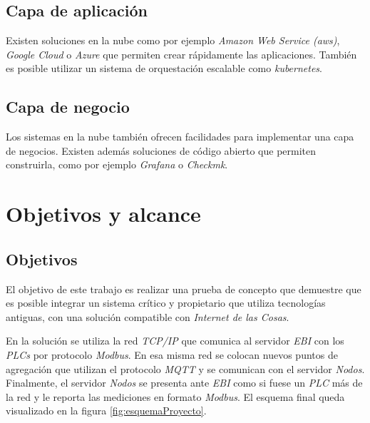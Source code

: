 	\subsection{Capa de aplicación}
	\label{artAplicacion}
	
		Existen soluciones en la nube como por ejemplo \emph{Amazon Web Service (aws)}, \emph{Google Cloud} o \emph{Azure} que permiten crear rápidamente las aplicaciones. También es posible utilizar un sistema de orquestación escalable como \emph{kubernetes}.
	
	\subsection{Capa de negocio}
	\label{artNegocio}	
	
		Los sistemas en la nube también ofrecen facilidades para implementar una capa de negocios. Existen además soluciones de código abierto que permiten construirla, como por ejemplo \emph{Grafana} o \emph{Checkmk}.

\section{Objetivos y alcance}
\label{objetivos}
	\subsection{Objetivos}
	
		El objetivo de este trabajo es realizar una prueba de concepto que demuestre que es posible integrar un sistema crítico y propietario que utiliza tecnologías antiguas, con una solución compatible con \emph{Internet de las Cosas}.
		
		En la solución se utiliza la red \emph{TCP/IP} que comunica al servidor \emph{EBI} con los \emph{PLCs} por protocolo \emph{Modbus}. En esa misma red se colocan nuevos puntos de agregación que utilizan el protocolo \emph{MQTT} y se comunican con el servidor \emph{Nodos}. Finalmente, el servidor \emph{Nodos} se presenta ante \emph{EBI} como si fuese un \emph{PLC} más de la red y le reporta las mediciones en formato \emph{Modbus}. El esquema final queda visualizado en la figura \ref{fig:esquemaProyecto}.
	
